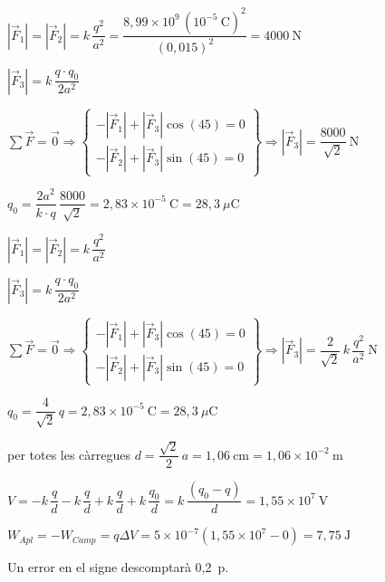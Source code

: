 \begin{solapartat}
\begin{minipage}[t]{0.7\linewidth}
 $\left|\vec{F}_1\right| = \left|\vec{F}_2\right| = k\,\dfrac{q^2}{a^2} = \dfrac{8,99\times 10^{9}\,(10^{-5}\ \mathrm{C})^2}{(0,015)^2} = 4000\ \mathrm{N}$

\smallskip
{} $\left|\vec{F}_3\right| = k\,\dfrac{q\cdot q_0}{2a^2}$

\smallskip
{} $\sum\vec{F} = \vec{0} \Rightarrow \left\{\begin{array}{l} -\left|\vec{F}_1\right| + \left|\vec{F}_3\right|\cos(45) = 0\\ -\left|\vec{F}_2\right| + \left|\vec{F}_3\right|\sin(45) = 0 \end{array}\right\} \Rightarrow \left|\vec{F}_3\right| = \dfrac{8000}{\sqrt{2}}\ \mathrm{N}$

\smallskip
{} $q_0 = \dfrac{2a^2}{k\cdot q}\,\dfrac{8000}{\sqrt{2}} = 2,83\times 10^{-5}\ \mathrm{C} = 28,3\ \mu\mathrm{C}$ \quad{}
\end{minipage}\hfill
\begin{minipage}[t]{0.27\linewidth}
\vspace{0pt}
\end{minipage}

\medskip
{}

\smallskip
{} $\left|\vec{F}_1\right| = \left|\vec{F}_2\right| = k\,\dfrac{q^2}{a^2}$

\smallskip
{} $\left|\vec{F}_3\right| = k\,\dfrac{q\cdot q_0}{2a^2}$

\smallskip
{} $\sum\vec{F} = \vec{0} \Rightarrow \left\{\begin{array}{l} -\left|\vec{F}_1\right| + \left|\vec{F}_3\right|\cos(45) = 0\\ -\left|\vec{F}_2\right| + \left|\vec{F}_3\right|\sin(45) = 0 \end{array}\right\} \Rightarrow \left|\vec{F}_3\right| = \dfrac{2}{\sqrt{2}}\,k\,\dfrac{q^2}{a^2}\ \mathrm{N}$

\smallskip
{} $q_0 = \dfrac{4}{\sqrt{2}}\,q = 2,83\times 10^{-5}\ \mathrm{C} = 28,3\ \mu\mathrm{C}$ \quad{}
\end{solapartat}

\begin{solapartat}
 per totes les càrregues $d = \dfrac{\sqrt{2}}{2}\,a = 1,06\ \mathrm{cm} = 1,06\times 10^{-2}\ \mathrm{m}$

\smallskip
{} $V = -k\,\dfrac{q}{d} - k\,\dfrac{q}{d} + k\,\dfrac{q}{d} + k\,\dfrac{q_0}{d} = k\,\dfrac{(q_0 - q)}{d} = 1,55\times 10^{7}\ \mathrm{V}$ \quad{}

\smallskip
{} $W_{Apl} = -W_{Camp} = q\Delta V = 5\times 10^{-7}\left(1,55\times 10^{7} - 0\right) = 7,75\ \mathrm{J}$

Un error en el signe descomptarà 0,2~p.
\end{solapartat}
